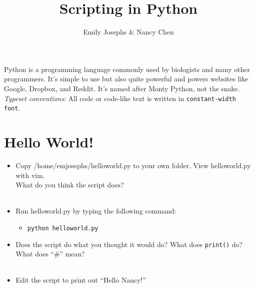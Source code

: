 \documentclass[11pt]{article}
\title{Scripting in Python}
\author{Emily Josephs \& Nancy Chen}
\begin{document}
\maketitle

Python is a programming language commonly used by biologists and many other programmers. It's simple to use but also quite powerful and powers websites like Google, Dropbox, and Reddit. It's named after Monty Python, not the snake. 
\textsl{Typeset conventions}: All code or code-like text is written in \texttt{constant-width font}.\\

\section*{Hello World!}
\begin{itemize}

\item Copy /home/emjosephs/hello\textunderscore world.py to your own folder. View hello\textunderscore world.py with vim. \\
  What do you think the script does?\\
\\

\item Run hello\textunderscore world.py by typing the following command:\\
\begin{itemize}
\item \texttt {python hello\textunderscore world.py} \\
  \end{itemize}


\item Does the script do what you thought it would do? What does \texttt{print()} do? What does ``\#'' mean?\\
\\
\item Edit the script to print out ``Hello Nancy!''
\\
\end{itemize}

\pagebreak
\end{document}
